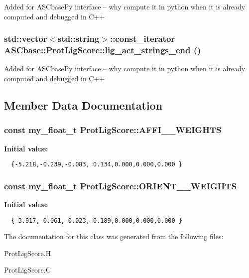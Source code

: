 Added for ASCbase\-Py interface -- why compute it in python when it is already computed and debugged in C++ 
\subsubsection{\setlength{\rightskip}{0pt plus 5cm}std::vector$<$std::string$>$::const\_\-iterator ASCbase::Prot\-Lig\-Score::lig\_\-act\_\-strings\_\-end ()\hspace{0.3cm}{\tt  [inline]}}\label{classASCbase_1_1ProtLigScore_934c0d6ca9955e06c2548020e415a1e9}


Added for ASCbase\-Py interface -- why compute it in python when it is already computed and debugged in C++ 

\subsection{Member Data Documentation}
\subsubsection{\setlength{\rightskip}{0pt plus 5cm}const my\_\-float\_\-t Prot\-Lig\-Score::AFFI\_\_\-WEIGHTS\hspace{0.3cm}{\tt  [static, private]}}\label{classASCbase_1_1ProtLigScore_fed52d2f3a0f38d69cb8cfd172a0798e}


\textbf{Initial value:}

\begin{Code}\begin{verbatim} 
  {-5.218,-0.239,-0.083, 0.134,0.000,0.000,0.000 }
\end{verbatim}\end{Code}
\subsubsection{\setlength{\rightskip}{0pt plus 5cm}const my\_\-float\_\-t Prot\-Lig\-Score::ORIENT\_\_\-WEIGHTS\hspace{0.3cm}{\tt  [static, private]}}\label{classASCbase_1_1ProtLigScore_d03935e16ddc38eacaaad7939c38c030}


\textbf{Initial value:}

\begin{Code}\begin{verbatim} 
  {-3.917,-0.061,-0.023,-0.189,0.000,0.000,0.000 }
\end{verbatim}\end{Code}


The documentation for this class was generated from the following files:\begin{CompactItemize}
\item 
Prot\-Lig\-Score.H\item 
Prot\-Lig\-Score.C\end{CompactItemize}
